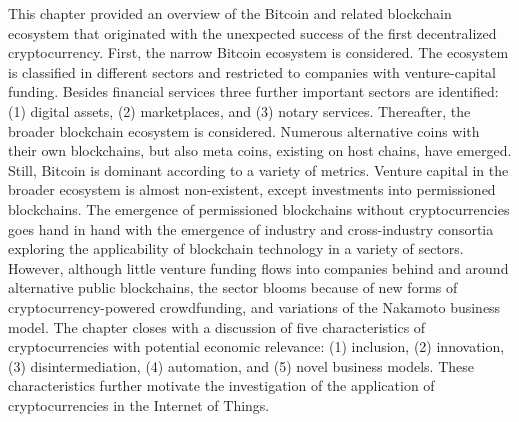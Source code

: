This chapter provided an overview of the Bitcoin and related blockchain ecosystem that originated with the unexpected success of the first decentralized cryptocurrency. First, the narrow Bitcoin ecosystem is considered. The ecosystem is classified in different sectors and restricted to companies with venture-capital funding. Besides financial services three further important sectors are identified: (1) digital assets, (2) marketplaces, and (3) notary services. Thereafter, the broader blockchain ecosystem is considered. Numerous alternative coins with their own blockchains, but also meta coins, existing on host chains, have emerged. Still, Bitcoin is dominant according to a variety of metrics. Venture capital in the broader ecosystem is almost non-existent, except investments into permissioned blockchains. The emergence of permissioned blockchains without cryptocurrencies goes hand in hand with the emergence of industry and cross-industry consortia exploring the applicability of blockchain technology in a variety of sectors. However, although little venture funding flows into companies behind and around alternative public blockchains, the sector blooms because of new forms of cryptocurrency-powered crowdfunding, and variations of the Nakamoto business model. The chapter closes with a discussion of five characteristics of cryptocurrencies with potential economic relevance: (1) inclusion, (2) innovation, (3) disintermediation, (4) automation, and (5) novel business models. These characteristics further motivate the investigation of the application of cryptocurrencies in the Internet of Things.
